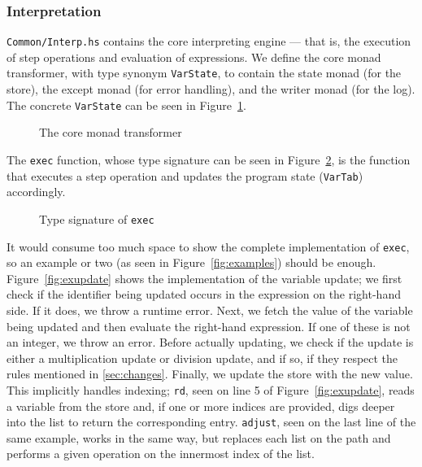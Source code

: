 \subsubsection{Interpretation}
\texttt{Common/Interp.hs} contains the core interpreting engine --- that is, the execution of step operations and evaluation of expressions. We define the core monad transformer, with type synonym \texttt{VarState}, to contain the state monad (for the store), the except monad (for error handling), and the writer monad (for the log). The concrete \texttt{VarState} can be seen in Figure~\ref{fig:varstate}.

\begin{figure}[H]
  
  \caption{The core monad transformer}\label{fig:varstate}
\end{figure}

\noindent The \texttt{exec} function, whose type signature can be seen in Figure~\ref{fig:exec}, is the function that executes a step operation and updates the program state (\texttt{VarTab}) accordingly.

\begin{figure}[H]
  
  \caption{Type signature of \texttt{exec}}\label{fig:exec}
\end{figure}

\noindent It would consume too much space to show the complete implementation of \texttt{exec}, so an example or two (as seen in Figure~\ref{fig:examples}) should be enough. Figure~\ref{fig:exupdate} shows the implementation of the variable update; we first check if the identifier being updated occurs in the expression on the right-hand side. If it does, we throw a runtime error. Next, we fetch the value of the variable being updated and then evaluate the right-hand expression. If one of these is not an integer, we throw an error. Before actually updating, we check if the update is either a multiplication update or division update, and if so, if they respect the rules mentioned in \ref{sec:changes}. Finally, we update the store with the new value. This implicitly handles indexing; \texttt{rd}, seen on line 5 of Figure~\ref{fig:exupdate}, reads a variable from the store and, if one or more indices are provided, digs deeper into the list to return the corresponding entry. \texttt{adjust}, seen on the last line of the same example, works in the same way, but replaces each list on the path and performs a given operation on the innermost index of the list.

